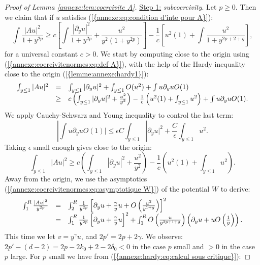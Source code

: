 \documentclass[11pt,a4paper,reqno]{amsart}
\theoremstyle{remark}
\numberwithin{equation}{section}
\begin{document}
\begin{appendix}
\begin{proof}[Proof of Lemma \ref{annexe:lem:coercivite A}]
 \underline{Step 1:} \emph{subcoercivity}. Let $p\geq 0$. Then we claim that if $u$ satisfies {{\rm (\ref{{annexe:eq:condition d'inte pour A}})}}:
\begin{equation}
\int \frac{|Au|^2}{1+y^{2p}}\geq c\left[ \int \frac{|\partial_y u|^2}{1+y^{2p}}+\frac{u^2}{y^2(1+y^{2p})}\right]- \frac{1}{c} \left[ u^2(1)+\int \frac{u^2}{1+y^{2p+2+g}} \right] ,
\end{equation}
for a universal constant $c>0$. We start by computing close to the origin using {{\rm (\ref{{annexe:coercivitenormes:eq:def A}})}}, with the help of the Hardy inequality close to the origin {{\rm (\ref{{lemme:annexe:hardy1}})}}:
$$
\begin{array}{r c l}
\int_{y\leq 1}|Au|^2 &= & \int_{y\leq 1} |\partial_y u|^2+\int_{y\leq 1} O(u^2)+\int u\partial_yu O(1) \\
&\geq& c\left( \int_{y\leq 1} |\partial_y u|^2+\frac{u^2}{y^2} \right)-\frac{1}{c}\left(u^2(1)+\int_{y\leq 1}u^2\right)+\int u\partial_yu O(1)  .
\end{array} 
$$
We apply Cauchy-Schwarz and Young inequality to control the last term:
$$
\left| \int u\partial_yu O(1) |\leq \epsilon C \int_{y\leq 1} \right| \partial_y u|^2+\frac{C}{\epsilon}\int_{y\leq 1}u^2.
$$
Taking $\epsilon$ small enough gives close to the origin:
\begin{equation} \label{annexe:coerciviteA:eq:expression pres}
\int_{y\leq 1}|Au|^2\geq c\left( \int_{y\leq 1} |\partial_y u|^2+\frac{u^2}{y^2} \right)-\frac{1}{c}\left(u^2(1)+\int_{y\leq 1}u^2\right).
\end{equation}
Away from the origin, we use the asymptotics {{\rm (\ref{{annexe:coercivitenormes:eq:asymptotique W}})}} of the potential $W$ to derive:
\begin{equation} \label{annexe:coerciviteA:eq:expression loin}
\begin{array}{r c l}
\int_1^R \frac{|Au|^2}{y^{2p}}&=&\int_2^R \frac{1}{y^{2p}}\left[ \partial_y u +\frac{\gamma}{y}u+O\left( \frac{u^2}{y^{1+g}}\right)\right]^2 \\
&= & \int_1^R \frac{1}{y^{2p}}\left[ \partial_y u +\frac{\gamma}{y}u\right]^2  + \int_1^R O\left(\frac{u}{y^{2p+1+g}}\right)\left( \partial_y u+uO\left(\frac{1}{y}\right)\right) .
\end{array}
\end{equation}
This time we let $v=y^{\gamma}u$, and $2p'=2p+2\gamma$. We observe: $2p'-(d-2)=2p-2k_0+2-2\delta_0<0$ in the case $p$ small and $>0$ in the case $p$ large. For $p$ small we have from {{\rm (\ref{{annexe:hardy:eq:calcul sous critique}})}}:

\end{proof}
\end{appendix}
\end{document}
